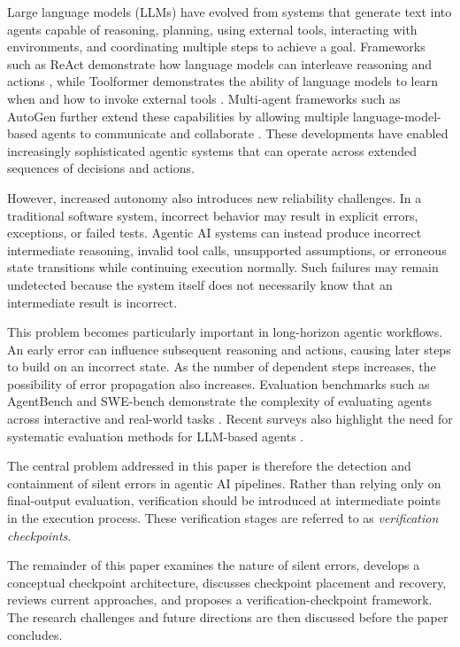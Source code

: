 \documentclass[12pt]{article}
\begin{document}
Large language models (LLMs) have evolved from systems that generate text into
agents capable of reasoning, planning, using external tools, interacting with
environments, and coordinating multiple steps to achieve a goal. Frameworks such
as ReAct demonstrate how language models can interleave reasoning and actions
\cite{yao2023react}, while Toolformer demonstrates the ability of language models
to learn when and how to invoke external tools \cite{schick2023toolformer}.
Multi-agent frameworks such as AutoGen further extend these capabilities by
allowing multiple language-model-based agents to communicate and collaborate
\cite{wu2023autogen}. These developments have enabled increasingly sophisticated
agentic systems that can operate across extended sequences of decisions and
actions.

However, increased autonomy also introduces new reliability challenges. In a
traditional software system, incorrect behavior may result in explicit errors,
exceptions, or failed tests. Agentic AI systems can instead produce incorrect
intermediate reasoning, invalid tool calls, unsupported assumptions, or erroneous
state transitions while continuing execution normally. Such failures may remain
undetected because the system itself does not necessarily know that an
intermediate result is incorrect.

This problem becomes particularly important in long-horizon agentic workflows.
An early error can influence subsequent reasoning and actions, causing later
steps to build on an incorrect state. As the number of dependent steps increases,
the possibility of error propagation also increases. Evaluation benchmarks such
as AgentBench and SWE-bench demonstrate the complexity of evaluating agents
across interactive and real-world tasks \cite{liu2024agentbench,jimenez2024swebench}.
Recent surveys also highlight the need for systematic evaluation methods for
LLM-based agents \cite{mohammadi2025evaluation,yehudai2026survey}.

The central problem addressed in this paper is therefore the detection and
containment of silent errors in agentic AI pipelines. Rather than relying only
on final-output evaluation, verification should be introduced at intermediate
points in the execution process. These verification stages are referred to as
\emph{verification checkpoints}.

The remainder of this paper examines the nature of silent errors, develops a
conceptual checkpoint architecture, discusses checkpoint placement and recovery,
reviews current approaches, and proposes a verification-checkpoint framework.
The research challenges and future directions are then discussed before the
paper concludes.
\end{document}
